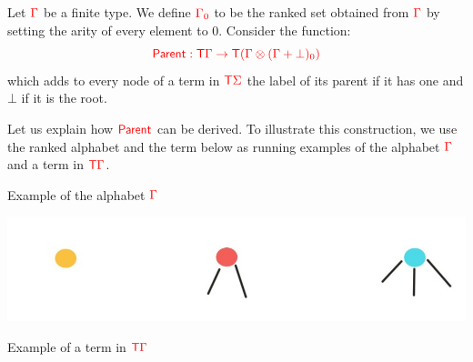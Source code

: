 \noindent \begin{example}\label{ex:sibling}  Let ${\color{red}{\Gamma}}$ be a finite type. We define ${\color{red}{{\color{red}{\Gamma}}_0}}$  to be the ranked set obtained from ${\color{red}{\Gamma}}$ by setting the arity of every element to $0$.  
\medskip
Consider the function:
$${\color{red}{ \mathsf{Parent}: {\color{red}{\mathsf T}}{\color{red}{\Gamma}}\to {\color{red}{\mathsf T}}({\color{red}{\Gamma}}\otimes ({\color{red}{\Gamma}}+\bot)_0)}}$$
which adds to every node of a term in ${\color{red}{\mathsf T}} {\color{red}{\Sigma}}$ the label  of its parent if it has one and $\bot$ if it is the root.

Let us explain how ${\color{red}{\mathsf{Parent}}}$ can be derived. To illustrate this construction, we use the ranked alphabet and the term below as running examples of the alphabet ${\color{red}{\Gamma}}$ and a term in ${\color{red}{\mathsf T}}{\color{red}{\Gamma}}$.
\begin{center}
		Example of the alphabet ${\color{red}{\Gamma}}$
		
		\includegraphics[scale=.15]{MyPic0.jpg}
		
		Example of a term in ${\color{red}{\mathsf T}} {\color{red}{\Gamma}}$
		

\end{center}
\end{example}
